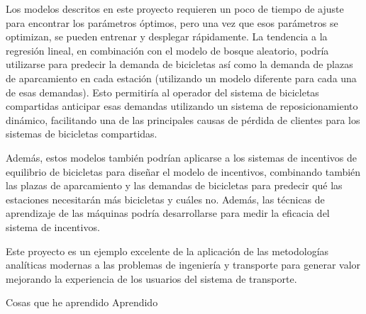 Los modelos descritos en este proyecto requieren un poco de tiempo de ajuste para encontrar los parámetros óptimos, pero una vez que esos parámetros se optimizan, se pueden entrenar y desplegar rápidamente. La tendencia a la regresión lineal, en combinación con el modelo de bosque aleatorio, podría utilizarse para predecir la demanda de bicicletas así como la demanda de plazas de aparcamiento en cada estación (utilizando un modelo diferente para cada una de esas demandas). Esto permitiría al operador del sistema de bicicletas compartidas anticipar esas demandas utilizando un sistema de reposicionamiento dinámico, facilitando una de las principales causas de pérdida de clientes para los sistemas de bicicletas compartidas.

Además, estos modelos también podrían aplicarse a los sistemas de incentivos de equilibrio de bicicletas para diseñar el modelo de incentivos, combinando también las plazas de aparcamiento y las demandas de bicicletas para predecir qué las estaciones necesitarán más bicicletas y cuáles no. Además, las técnicas de aprendizaje de las máquinas podría desarrollarse para medir la eficacia del sistema de incentivos.

Este proyecto es un ejemplo excelente de la aplicación de las metodologías analíticas modernas a las problemas de ingeniería y transporte para generar valor mejorando la experiencia de los usuarios del sistema de transporte.



Cosas que he aprendido
Aprendido 
